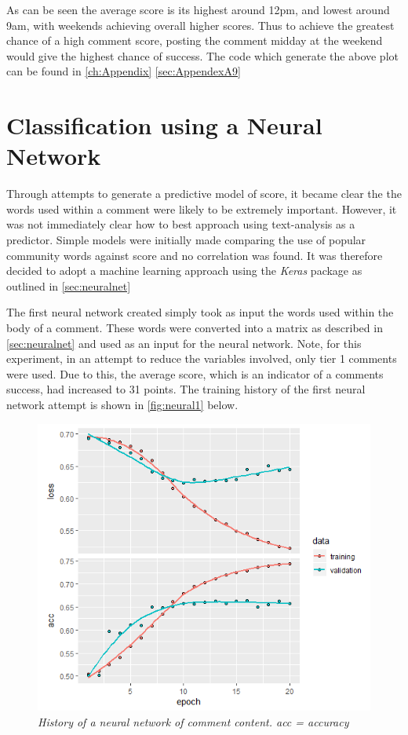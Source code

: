 As can be seen the average score is its highest around 12pm, and lowest around 9am, with weekends achieving overall higher scores. Thus to achieve the greatest chance of a high comment score, posting the comment midday at the weekend would give the highest chance of success. The code which generate the above plot can be found in \autoref{ch:Appendix} \autoref{sec:AppendexA9}

\section{Classification using a Neural Network}
\label{sec:NNclass}
Through attempts to generate a predictive model of score, it became clear the the words used within a comment were likely to be extremely important. However, it was not immediately clear how to best approach using text-analysis as a predictor. Simple models were initially made comparing the use of popular community words against score and no correlation was found. It was therefore decided to adopt a machine learning approach using the \textit{Keras} package as outlined in \autoref{sec:neuralnet}

The first neural network created simply took as input the words used within the body of a comment. These words were converted into a matrix as described in \autoref{sec:neuralnet} and used as an input for the neural network. Note, for this experiment, in an attempt to reduce the variables involved, only tier 1 comments were used. Due to this, the average score, which is an indicator of a comments success, had increased to 31 points. The training history of the first neural network attempt is shown in \autoref{fig:neural1} below.

 \begin{figure}[H]
        \centering
        \includegraphics[width=1.0\textwidth]{graphs/neural1.png}
        \caption{\textit{History of a neural network of comment content. acc = accuracy}}
        \label{fig:neural1}
    \end{figure}

